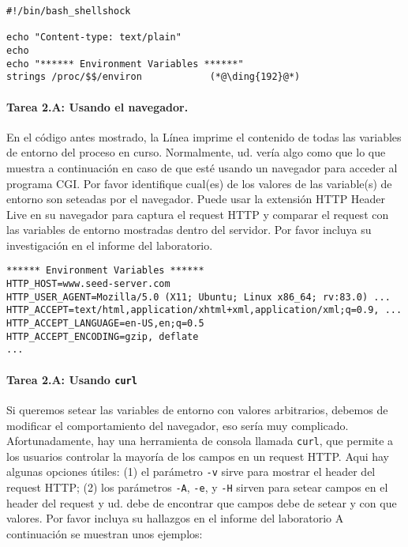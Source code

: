 \begin{lstlisting}[caption=\texttt{getenv.cgi}]
#!/bin/bash_shellshock             

echo "Content-type: text/plain"
echo
echo "****** Environment Variables ******"
strings /proc/$$/environ            (*@\ding{192}@*)
\end{lstlisting}

\paragraph{Tarea 2.A: Usando el navegador.}
En el código antes mostrado, la Línea  imprime el contenido de todas las variables de entorno del proceso en curso. Normalmente, ud. vería algo como que lo que muestra a continuación en caso de que esté usando un navegador para acceder al programa CGI. Por favor identifique cual(es) de los valores de las variable(s) de entorno son seteadas por el navegador. 
Puede usar la extensión HTTP Header Live en su navegador para captura el request HTTP y comparar el request con las variables de entorno mostradas dentro del servidor. Por favor incluya su investigación en el informe del laboratorio.

\begin{lstlisting}
****** Environment Variables ******
HTTP_HOST=www.seed-server.com
HTTP_USER_AGENT=Mozilla/5.0 (X11; Ubuntu; Linux x86_64; rv:83.0) ...
HTTP_ACCEPT=text/html,application/xhtml+xml,application/xml;q=0.9, ...
HTTP_ACCEPT_LANGUAGE=en-US,en;q=0.5
HTTP_ACCEPT_ENCODING=gzip, deflate
...
\end{lstlisting}

 
\paragraph{Tarea 2.A: Usando \texttt{curl}}
Si queremos setear las variables de entorno con valores arbitrarios, debemos de modificar el comportamiento del navegador, eso sería muy complicado. Afortunadamente, hay una herramienta de consola llamada \texttt{curl}, que permite a los usuarios controlar la mayoría de los campos en un request HTTP. Aqui hay algunas opciones útiles: (1) el parámetro \texttt{-v} sirve para mostrar el header del request HTTP; (2) los parámetros  \texttt{-A}, \texttt{-e}, y 
\texttt{-H} sirven para setear campos en el header del request y ud. debe de encontrar que campos debe de setear y con que valores.
Por favor incluya su hallazgos en el informe del laboratorio
A continuación se muestran unos ejemplos:
 

